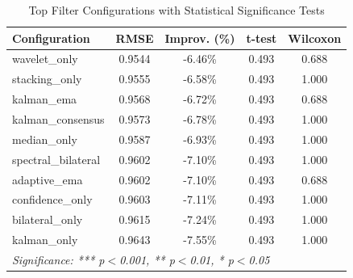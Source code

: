 \begin{table}[htbp]
\centering
\caption{Top Filter Configurations with Statistical Significance Tests}
\label{tab:statistical-significance}
\begin{tabular}{l|c|c|c|c}
\hline
\textbf{Configuration} & \textbf{RMSE} & \textbf{Improv. (\%)} & \textbf{t-test} & \textbf{Wilcoxon} \\
\hline
wavelet\_only & 0.9544 & -6.46\% & 0.493 & 0.688 \\
stacking\_only & 0.9555 & -6.58\% & 0.493 & 1.000 \\
kalman\_ema & 0.9568 & -6.72\% & 0.493 & 0.688 \\
kalman\_consensus & 0.9573 & -6.78\% & 0.493 & 1.000 \\
median\_only & 0.9587 & -6.93\% & 0.493 & 1.000 \\
spectral\_bilateral & 0.9602 & -7.10\% & 0.493 & 1.000 \\
adaptive\_ema & 0.9602 & -7.10\% & 0.493 & 0.688 \\
confidence\_only & 0.9603 & -7.11\% & 0.493 & 1.000 \\
bilateral\_only & 0.9615 & -7.24\% & 0.493 & 1.000 \\
kalman\_only & 0.9643 & -7.55\% & 0.493 & 1.000 \\
\hline
\multicolumn{5}{l}{\textit{Significance: *** p$<$0.001, ** p$<$0.01, * p$<$0.05}} \\
\hline
\end{tabular}
\end{table}